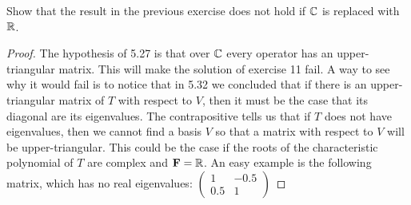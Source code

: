 \begin{exercise}{12}
  Show that the result in the previous exercise does not hold if $\mathbb{C}$ is replaced with $\mathbb{R}$.
\end{exercise}
\begin{proof}
 The hypothesis of 5.27 is that over $\mathbb{C}$ every operator has an upper-triangular matrix. This will make the solution of exercise 11 fail. A way to see why it would fail is to notice that in 5.32 we concluded that if there is an upper-triangular matrix of $T$ with respect to $V$, then it must be the case that its diagonal are its eigenvalues. The contrapositive tells us that if $T$ does not have eigenvalues, then we cannot find a basis $V$ so that a matrix with respect to $V$ will be upper-triangular. This could be the case if the roots of the characteristic polynomial of $T$ are complex and $\mathbf{F}=\mathbb{R}$. An easy example is the following matrix, which has no real eigenvalues: 
 $
 \begin{pmatrix}
 1&-0.5\\
 0.5&1
 \end{pmatrix}
 $
\end{proof}